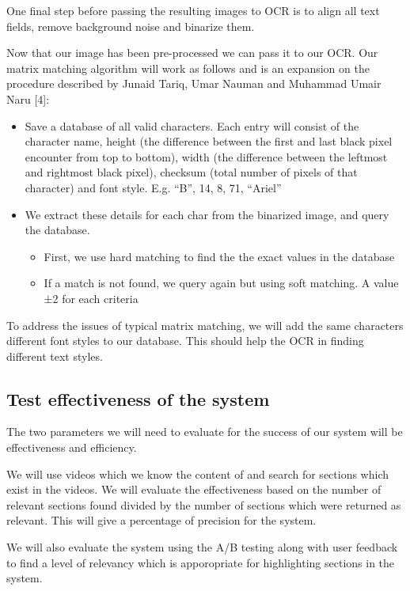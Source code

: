 \documentclass[a4paper,12pt]{article}
\begin{document}
One final step before passing the resulting images to OCR is to align all text fields, remove background noise and binarize them.

Now that our image has been pre-processed we can pass it to our OCR. Our matrix matching algorithm will work as follows and is an expansion on the procedure described by Junaid Tariq, Umar Nauman and Muhammad Umair Naru [4]:

\begin{itemize}
\item
Save a database of all valid characters. Each entry will consist of the character name, height (the difference between the first and last black pixel encounter from top to bottom), width (the difference between the leftmost and rightmost black pixel), checksum (total number of pixels of that character) and font style. E.g. “B”, 14, 8, 71, “Ariel”
\item
We extract these details for each char from the binarized image, and query the database.
\begin{itemize}
\item
First, we use hard matching to find the the exact values in the database
\item
If a match is not found, we query again but using soft matching. A value ±2 for each criteria
\end{itemize}
\end{itemize}

To address the issues of typical matrix matching, we will add the same characters different font styles to our database. This should help the OCR in finding different text styles.

\subsection{Test effectiveness of the system}
The two parameters we will need to evaluate for the success of our system will be effectiveness and efficiency.

We will use videos which we know the content of and search for sections which exist in the videos. We will evaluate the effectiveness based on the number of relevant sections found divided by the number of sections which were returned as relevant. This will give a percentage of precision for the system.

We will also evaluate the system using the A/B testing along with user feedback to find a level of relevancy which is apporopriate for highlighting sections in the system.
\end{document}

